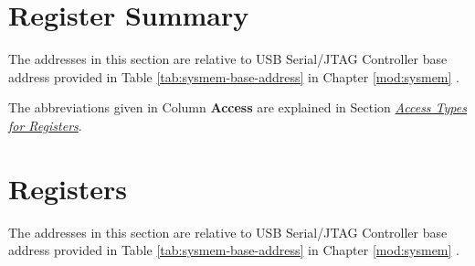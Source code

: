 \documentclass[main\_\_EN.tex]{subfiles}
\begin{document}


\clearpage
\section{Register Summary}
\label{sec:usbserialjtag-reg-summ}
\hypertarget{usbserialjtag-reg-summ}{}

The addresses in this section are relative to USB Serial/JTAG Controller base address provided in Table \ref{tab:sysmem-base-address} in Chapter \ref{mod:sysmem} \textit{}.

The abbreviations given in Column \textbf{Access} are explained in Section \hyperref[glossary-access-types]{\textit{Access Types for Registers}}.






\clearpage
\section{Registers}

The addresses in this section are relative to USB Serial/JTAG Controller base address provided in Table \ref{tab:sysmem-base-address} in Chapter \ref{mod:sysmem} \textit{}.


\end{document}

